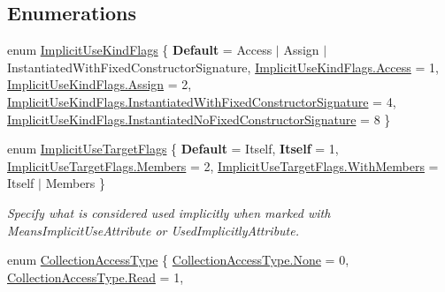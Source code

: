\subsection*{Enumerations}
\begin{DoxyCompactItemize}
\item 
enum \mbox{\hyperlink{namespace_r_f_storage_a858608c6c632849e1730c5fafed9fa25}{Implicit\+Use\+Kind\+Flags}} \{ \newline
{\bfseries Default} = Access $\vert$ Assign $\vert$ Instantiated\+With\+Fixed\+Constructor\+Signature, 
\mbox{\hyperlink{namespace_r_f_storage_a858608c6c632849e1730c5fafed9fa25abf733d8a933c1601697f364223fc7ecb}{Implicit\+Use\+Kind\+Flags.\+Access}} = 1, 
\mbox{\hyperlink{namespace_r_f_storage_a858608c6c632849e1730c5fafed9fa25a185b7133db22230701a857c059360cc2}{Implicit\+Use\+Kind\+Flags.\+Assign}} = 2, 
\mbox{\hyperlink{namespace_r_f_storage_a858608c6c632849e1730c5fafed9fa25a88199ed5f1baf0dc6ed80a0db9336403}{Implicit\+Use\+Kind\+Flags.\+Instantiated\+With\+Fixed\+Constructor\+Signature}} = 4, 
\newline
\mbox{\hyperlink{namespace_r_f_storage_a858608c6c632849e1730c5fafed9fa25a4ea3601c5369a85043a3d88bbe23d4f6}{Implicit\+Use\+Kind\+Flags.\+Instantiated\+No\+Fixed\+Constructor\+Signature}} = 8
 \}
\item 
enum \mbox{\hyperlink{namespace_r_f_storage_a11267cbdad6c26a08cf6b5c281d2f67b}{Implicit\+Use\+Target\+Flags}} \{ {\bfseries Default} = Itself, 
{\bfseries Itself} = 1, 
\mbox{\hyperlink{namespace_r_f_storage_a11267cbdad6c26a08cf6b5c281d2f67baef53538ae41a651c7f72ab6cb1135d8c}{Implicit\+Use\+Target\+Flags.\+Members}} = 2, 
\mbox{\hyperlink{namespace_r_f_storage_a11267cbdad6c26a08cf6b5c281d2f67ba5583bb135f4d32715af96327c369e623}{Implicit\+Use\+Target\+Flags.\+With\+Members}} = Itself $\vert$ Members
 \}
\begin{DoxyCompactList}\small\item\em Specify what is considered used implicitly when marked with Means\+Implicit\+Use\+Attribute or Used\+Implicitly\+Attribute. \end{DoxyCompactList}\item 
enum \mbox{\hyperlink{namespace_r_f_storage_a0db1dea9793c2bb602b4a93dad0de1c6}{Collection\+Access\+Type}} \{ \mbox{\hyperlink{namespace_r_f_storage_a0db1dea9793c2bb602b4a93dad0de1c6a6adf97f83acf6453d4a6a4b1070f3754}{Collection\+Access\+Type.\+None}} = 0, 
\mbox{\hyperlink{namespace_r_f_storage_a0db1dea9793c2bb602b4a93dad0de1c6a7a1a5f3e79fdc91edf2f5ead9d66abb4}{Collection\+Access\+Type.\+Read}} = 1, 

\end{DoxyCompactItemize}
